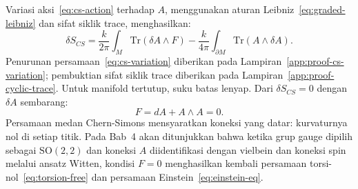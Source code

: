 Variasi aksi~\eqref{eq:cs-action} terhadap $A$, menggunakan aturan Leibniz~\eqref{eq:graded-leibniz} dan sifat siklik trace, menghasilkan:
\begin{equation}\label{eq:cs-variation}
    \delta S_{CS} = \frac{k}{2\pi}\int_M \mathrm{Tr}(\delta A \wedge F) - \frac{k}{4\pi}\int_{\partial M} \mathrm{Tr}(A \wedge \delta A).
\end{equation}
Penurunan persamaan~\eqref{eq:cs-variation} diberikan pada Lampiran~\ref{app:proof-cs-variation}; pembuktian sifat siklik trace diberikan pada Lampiran~\ref{app:proof-cyclic-trace}. Untuk manifold tertutup, suku batas lenyap. Dari $\delta S_{CS} = 0$ dengan $\delta A$ sembarang:
\begin{equation}\label{eq:flatness}
    F = dA + A \wedge A = 0.
\end{equation}
Persamaan medan Chern-Simons mensyaratkan koneksi yang datar: kurvaturnya nol di setiap titik. Pada Bab~4 akan ditunjukkan bahwa ketika grup gauge dipilih sebagai $\mathrm{SO}(2,2)$ dan koneksi $A$ diidentifikasi dengan vielbein dan koneksi spin melalui ansatz Witten, kondisi $F = 0$ menghasilkan kembali persamaan torsi-nol~\eqref{eq:torsion-free} dan persamaan Einstein~\eqref{eq:einstein-eq}.